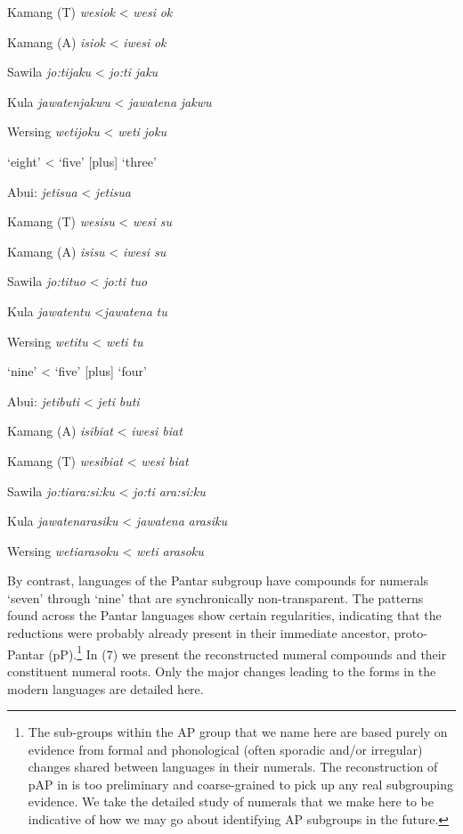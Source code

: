 {Kamang (T)  \textit{wesi}\textit{{\ng}}\textit{ok}    {\textless}  \textit{wesi}\textit{{\ng}}    \textit{ok}

Kamang (A)  \textit{isi{\ng}ok}      {\textless}  \textit{iwesi{\ng}}    \textit{ok}

Sawila    \textit{jo:ti{\ng}jaku}     {\textless}  \textit{jo:ti{\ng}}    \textit{jaku}

Kula    \textit{jawatenjakwu}    {\textless}  \textit{jawatena}  \textit{jakwu}

Wersing  \textit{weti{\ng}joku}    {\textless}  \textit{weti{\ng}}    \textit{joku}

\ex      `eight'      {\textless}  `five'  [plus]  `three'

    Abui:    \textit{jeti}\textit{{\ng}}\textit{sua}    {\textless}  \textit{jeti{\ng}}\textit{sua}

Kamang (T)  \textit{wesi{\ng}su}    {\textless}  \textit{wesi{\ng}    su}

Kamang (A)  \textit{isi{\ng}su}      {\textless}  \textit{iwesi{\ng}    su}

Sawila    \textit{jo:ti{\ng}tuo}     {\textless}  \textit{jo:ti{\ng}    tuo}

Kula    \textit{jawatentu}    {\textless}\textit{jawatena}  \textit{tu}

Wersing  \textit{weti{\ng}tu}      {\textless}  \textit{weti{\ng}}    \textit{tu}

  \ex      `nine'      {\textless}  `five'  [plus]  `four'

    Abui:    \textit{jeti}\textit{{\ng}}\textit{buti}    {\textless}  \textit{jeti{\ng}}    \textit{buti}

Kamang (A)  \textit{isi{\ng}biat}      {\textless}  \textit{iwesi{\ng}    biat}

Kamang (T)  \textit{wesi{\ng}biat}    {\textless}  \textit{wesi{\ng}    biat}

Sawila    \textit{jo:ti{\ng}ara:si:ku}    {\textless}  \textit{jo:ti{\ng}    ara:si:ku}

Kula    \textit{jawatenarasiku}  {\textless}  \textit{jawatena}  \textit{arasiku}

Wersing  \textit{weti{\ng}arasoku}    {\textless}  \textit{weti{\ng}}    \textit{arasoku}
\z
\z

By contrast, languages of the Pantar subgroup have compounds for numerals `seven' through `nine' that are synchronically non-transparent. The patterns found across the Pantar languages show certain regularities, indicating that the reductions were probably already present in their immediate ancestor, proto-Pantar (pP).\footnote{{}   The sub-groups within the AP group that we name here are based purely on evidence from formal and phonological (often sporadic and/or irregular) changes shared between languages in their numerals. The reconstruction of pAP in \citet{HoltonEtAl2012} is too preliminary and coarse-grained to pick up any real subgrouping evidence. We take the detailed study of numerals that we make here to be indicative of how we may go about identifying AP subgroups in the future.}  In (7) we present the reconstructed numeral compounds and their constituent numeral roots. Only the major changes leading to the forms in the modern languages are detailed here.

}
